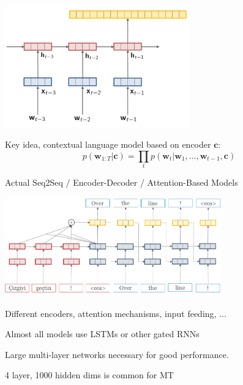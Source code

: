 \documentclass{beamer}
\let\tempone\itemize
\let\temptwo\enditemize
\renewenvironment{itemize}{\tempone\addtolength{\itemsep}{0.5\baselineskip}}{\temptwo}
\newcommand{\air}{\vspace{0.25cm}}
\newcommand{\wvec}{\mathbf{w}}
\newcommand{\cvec}{\mathbf{c}}
\begin{document}
\begin{frame}
  \begin{center}
  \end{center}
    \air 
   
    \begin{center}
      \includegraphics[width=0.6\textwidth]{rnnlm6}
    \end{center}
  \begin{itemize}
  \item Key idea, contextual language model based on encoder $\cvec$: 
  \end{itemize}
  \[ p(\wvec_{1:T} | \cvec) = \prod_{t} p(\wvec_t | \wvec_1, \ldots, \wvec_{t-1}, \cvec) \] 
  
\end{frame}


\begin{frame}
  \begin{center}
    Actual Seq2Seq / Encoder-Decoder / Attention-Based Models
  \end{center}
    \begin{center}
      \includegraphics[width=0.7\textwidth]{simple-attn}
    \end{center}
  \begin{itemize}
  \item Different encoders, attention mechanisms, input feeding, ...
    \air
  \item Almost all models use LSTMs or other gated RNNs 
    \air
  \item Large multi-layer networks  necessary for good performance.
    \begin{itemize}
    \item 4 layer, 1000 hidden dims is common for MT
    \end{itemize}
  \end{itemize}
\end{frame}
\end{document}
